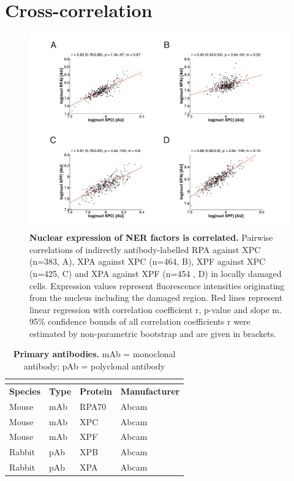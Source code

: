 \newpage
\section{Cross-correlation}

\begin{figure}[h!]
	\begin{center}
		\includegraphics[width=1\textwidth]{Abbildungen/figure_A_2.pdf}
		\caption{\textbf{Nuclear expression of NER factors is correlated.} Pairwise correlations of indirectly antibody-labelled RPA against XPC (n=383, A), XPA against XPC (n=464, B), XPF against XPC (n=425, C) and XPA against XPF (n=454 , D) in locally damaged cells. Expression values represent fluorescence intensities originating from the nucleus including the damaged region. Red lines represent linear regression with correlation coefficient r, p-value and slope m. 95\% confidence bounds of all correlation coefficients r were estimated by non-parametric bootstrap and are given in brackets. }
		\label{fig:nuklearCrosscorrelation}
	\end{center}
\end{figure}


\begin{table}[H]
	
\begin{center}
	\begin{tabular}{llll}
		
		\multicolumn{4}{l}{} \\
		\hline
		\rule{0pt}{2ex}
		\textbf{Species}    &\textbf{Type} & \textbf{Protein} & \textbf{Manufacturer} \\
		\hline
		
		Mouse & mAb & RPA70 & Abcam       \\
		Mouse & mAb & XPC   & Abcam       \\
		Mouse & mAb & XPF & Abcam       \\
		Rabbit & pAb & XPB & Abcam       \\
		Rabbit & pAb & XPA & Abcam       \\
		\hline
	\end{tabular}
	\caption{\textbf{Primary antibodies.}  mAb = monoclonal antibody; pAb = polyclonal antibody}
	\label{tab:antibodies}
	\end{center}
\end{table}

